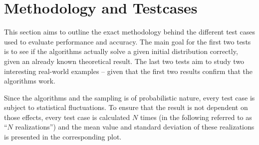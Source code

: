 \section{Methodology and Testcases}\label{sec:methodology_and_testcases}

This section aims to outline the exact methodology behind the different test cases used to evaluate performance and accuracy. The main goal for the first two tests is to see if the algorithms actually solve a given initial distribution correctly, given an already known theoretical result. The last two tests aim to study two interesting real-world examples -- given that the first two results confirm that the algorithms work. 

Since the algorithms and the sampling is of probabilistic nature, every test case is subject to statistical fluctuations. To ensure that the result is not dependent on those effects, every test case is calculated $N$ times (in the following referred to as ``$N$ realizations'') and the mean value and standard deviation of these realizations is presented in the corresponding plot.

